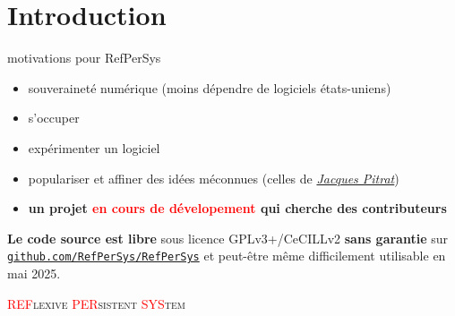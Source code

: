 \documentclass[final,a4]{beamer}
\begin{document}
 \section{Introduction}
 \label{sec:intro}
 
 \begin{frame}{motivations pour RefPerSys}

   \begin{itemize}
   \item souveraineté numérique \small{(moins dépendre de logiciels
     états-uniens)}
   \item s'occuper 
   \item expérimenter un logiciel
   \item populariser et affiner des idées méconnues (celles de
     \href{https://fr.wikipedia.org/wiki/Jacques_Pitrat}{\it Jacques
       Pitrat})
   \item \textbf{un projet \textcolor{red}{en cours de dévelopement} qui cherche des contributeurs}
   \end{itemize}

   \bigskip
   \textbf{Le code source est libre} sous licence GPLv3+/CeCILLv2
   \textbf{sans garantie} sur
   \href{https://github.com/RefPerSys/RefPerSys}{\texttt{github.com/RefPerSys/RefPerSys}}
   et peut-être même difficilement utilisable en mai 2025.

   \bigskip

   \begin{center}
     \large\textsc{\textcolor{red}{REF}lexive \textcolor{red}{PER}sistent \textcolor{red}{SYS}tem}
   \end{center}
 \end{frame}
 
\end{document}
